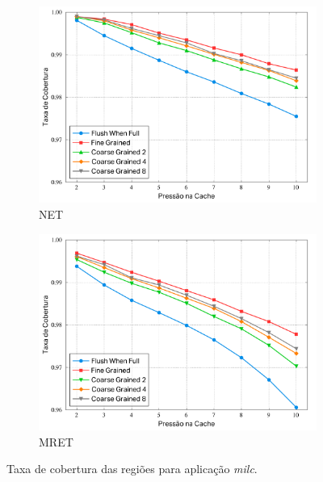 \documentclass[12pt,twoside]{article}
\begin{document}
\begin{figure}[!ht]
        \centering
        \begin{subfigure}[b]{0.45\textwidth}
                \includegraphics[width=\textwidth]{./figs/net-milc-coverage}
                \caption{NET}
        \end{subfigure}
        \quad 
                \begin{subfigure}[b]{0.45\textwidth}
                \includegraphics[width=\textwidth]{./figs/mret-milc-coverage}
                \caption{MRET}
        \end{subfigure}
\caption{Taxa de cobertura das regiões para aplicação \emph{milc}.}
\label{fig-coverage}
\end{figure}
\end{document}

